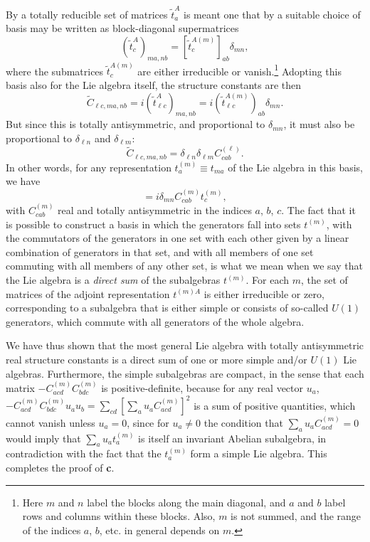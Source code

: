 By a totally reducible set of matrices $\widetilde t^A_a$ is meant one that by a suitable choice of basis may be written as block-diagonal supermatrices
\begin{equation}
 (\widetilde t^A_c)_{ma,nb}
 =[\widetilde t^{A(m)}_c]_{ab}\delta_{mn},
 \tag{15.A.6}\label{eq:15.A.6}
\end{equation}
where the submatrices $\widetilde t^{A(m)}_c$ are either irreducible or vanish.\footnote{Here $m$ and $n$ label the blocks along the main diagonal, and $a$ and $b$ label rows and columns within these blocks. Also, $m$ is not summed, and the range of the indices $a$, $b$, etc. in general depends on $m$.} Adopting this basis also for the Lie algebra itself, the structure constants are then
\begin{equation}
 \widetilde C_{\ell c,ma,nb}
 =i(\widetilde t^A_{\ell c})_{ma,nb}
 =i(\widetilde t^{A(m)}_{\ell c})_{ab}\delta_{mn}.
 \tag{15.A.7}\label{eq:15.A.7}
\end{equation}
But since this is totally antisymmetric, and proportional to $\delta_{mn}$, it must also be proportional to $\delta_{\ell n}$ and $\delta_{\ell m}$:
\begin{equation}
 \widetilde C_{\ell c,ma,nb}
 =\delta_{\ell n}\delta_{\ell m}C^{(\ell)}_{cab}.
 \tag{15.A.8}\label{eq:15.A.8}
\end{equation}
In other words, for any representation $t_a^{(m)}\equiv t_{ma}$ of the Lie algebra in this basis, we have
\begin{equation}
 [t_a^{(m)},t_b^{(n)}]
 =i\delta_{mn}C^{(m)}_{cab}t_c^{(m)},
 \tag{15.A.9}\label{eq:15.A.9}
\end{equation}
with $C^{(m)}_{cab}$ real and totally antisymmetric in the indices $a$, $b$, $c$. The fact that it is possible to construct a basis in which the generators fall into sets $t^{(m)}$, with the commutators of the generators in one set with each other given by a linear combination of generators in that set, and with all members of one set commuting with all members of any other set, is what we mean when we say that the Lie algebra is a \emph{direct sum} of the subalgebras $t^{(m)}$. For each $m$, the set of matrices of the adjoint representation $t^{(m)A}$ is either irreducible or zero, corresponding to a subalgebra that is either simple or consists of so-called $U(1)$ generators, which commute with all generators of the whole algebra.

We have thus shown that the most general Lie algebra with totally antisymmetric real structure constants is a direct sum of one or more simple and/or $U(1)$ Lie algebras. Furthermore, the simple subalgebras are compact, in the sense that each matrix $-C^{(m)}_{acd}C^{(m)}_{bdc}$ is positive-definite, because for any real vector $u_a$, $-C^{(m)}_{acd}C^{(m)}_{bdc}u_au_b=\sum_{cd}[\sum_a u_aC^{(m)}_{acd}]^2$ is a sum of positive quantities, which cannot vanish unless $u_a=0$, since for $u_a\ne0$ the condition that $\sum_a u_aC^{(m)}_{acd}=0$ would imply that $\sum_a u_at_a^{(m)}$ is itself an invariant Abelian subalgebra, in contradiction with the fact that the $t_a^{(m)}$ form a simple Lie algebra. This completes the proof of \textbf{c}.

